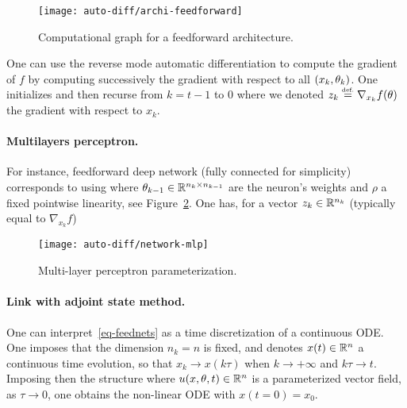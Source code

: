 \begin{figure}
\centering
\texttt{[image: auto-diff/archi-feedforward]} 
\caption{\label{fig-mlp}
Computational graph for a feedforward architecture.
}
\end{figure}


One can use the reverse mode automatic differentiation to compute the gradient of $f$ by computing successively the gradient with respect to all $(x_k,\theta_k)$. One initializes
and then recurse from $k=t-1$ to $0$
where we denoted $z_k \stackrel{\mbox{\upshape\tiny def.}}{=} \nabla_{x_{k}} f(\theta)$ the gradient with respect to $x_{k}$.

\paragraph{Multilayers perceptron.}

For instance, feedforward deep network (fully connected for simplicity) corresponds to using 
where $\theta_{k-1} \in \mathbb{R}^{n_{k} \times n_{k-1}}$ are the neuron's weights and $\rho$ a fixed pointwise linearity, see Figure~\ref{fig-mlp-param}.
%
One has, for a vector $z_k \in \mathbb{R}^{n_k}$ (typically equal to $\nabla_{x_{k}} f$)

\begin{figure}
\centering
\texttt{[image: auto-diff/network-mlp]} 
\caption{\label{fig-mlp-param}
Multi-layer perceptron parameterization.
}
\end{figure}



\paragraph{Link with adjoint state method.}

One can interpret~\eqref{eq-feednets} as a time discretization of a continuous ODE. 
%
One imposes that the dimension $n_k=n$ is fixed, and denotes $x(t) \in \mathbb{R}^n$ a continuous time evolution, so that $x_{k} \rightarrow x(k \tau)$ when $k \rightarrow +\infty$ and $k \tau \rightarrow t$. 
%
Imposing then the structure
where $u(x,\theta,t) \in \mathbb{R}^n$ is a parameterized vector field, as $\tau \rightarrow 0$, one obtains the non-linear ODE
with $x(t=0)=x_0$.

